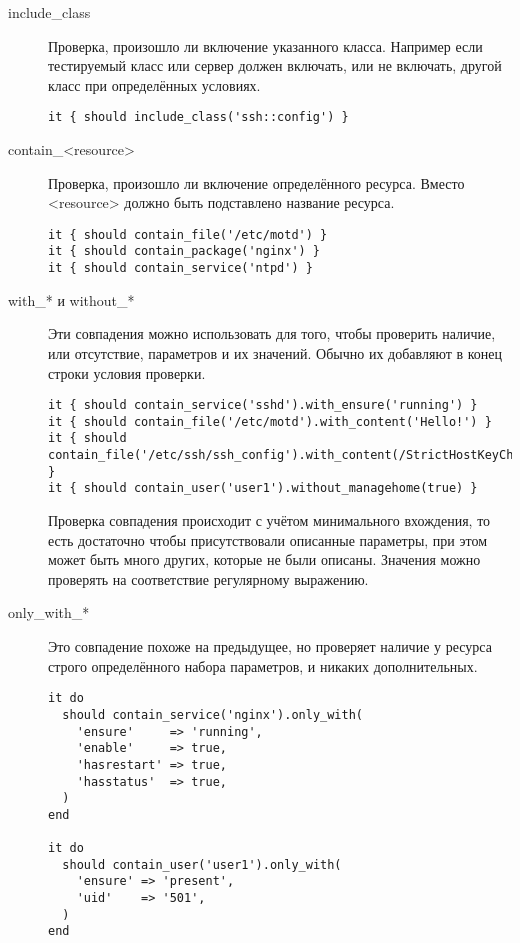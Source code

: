 \begin{description}
\item[include\_class]
Проверка, произошло ли включение указанного класса. Например если тестируемый класс или сервер должен включать, или не включать, другой класс при определённых условиях.

\begin{lstlisting}
it { should include_class('ssh::config') }
\end{lstlisting}

\item[contain\_\textless{}resource\textgreater{}]
Проверка, произошло ли включение определённого ресурса. Вместо \textless{}resource\textgreater{} должно быть подставлено название ресурса.

\begin{lstlisting}
it { should contain_file('/etc/motd') }
it { should contain_package('nginx') }
it { should contain_service('ntpd') }
\end{lstlisting}

\item[with\_* и without\_*]
Эти совпадения можно использовать для того, чтобы проверить наличие, или отсутствие, параметров и их значений. Обычно их добавляют в конец строки условия проверки.

\begin{lstlisting}
it { should contain_service('sshd').with_ensure('running') }
it { should contain_file('/etc/motd').with_content('Hello!') }
it { should contain_file('/etc/ssh/ssh_config').with_content(/StrictHostKeyChecking\s+no/) }
it { should contain_user('user1').without_managehome(true) }
\end{lstlisting}

Проверка совпадения происходит с учётом минимального вхождения, то есть достаточно чтобы присутствовали описанные параметры, при этом может быть много других, которые не были описаны. Значения можно проверять на соответствие регулярному выражению.

\item[only\_with\_*]
Это совпадение похоже на предыдущее, но проверяет наличие у ресурса строго определённого набора параметров, и никаких дополнительных.

\begin{lstlisting}
it do
  should contain_service('nginx').only_with(
    'ensure'     => 'running',
    'enable'     => true,
    'hasrestart' => true,
    'hasstatus'  => true,
  )
end

it do
  should contain_user('user1').only_with(
    'ensure' => 'present',
    'uid'    => '501',
  )
end
\end{lstlisting}


\end{description}
